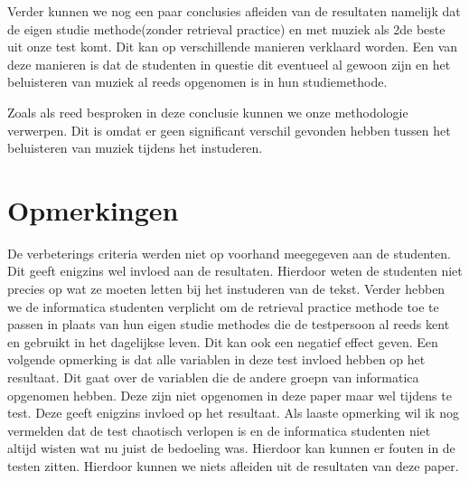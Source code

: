 \documentclass{hogent-article}
\begin{document}
	Verder kunnen we nog een paar conclusies afleiden van de resultaten namelijk dat de eigen studie methode(zonder retrieval practice) en met muziek als 2de beste uit onze test komt. Dit kan op verschillende manieren verklaard worden. Een van deze manieren is dat de studenten in questie dit eventueel al gewoon zijn en het beluisteren van muziek al reeds opgenomen is in hun studiemethode. 
	
	Zoals als reed besproken in deze conclusie kunnen we onze methodologie verwerpen. Dit is omdat er geen significant verschil gevonden hebben tussen het beluisteren van muziek tijdens het instuderen.
	
	
	\section{Opmerkingen}
	De verbeterings criteria werden niet op voorhand meegegeven aan de studenten. Dit geeft enigzins wel invloed aan de resultaten. Hierdoor weten de studenten niet precies op wat ze moeten letten bij het instuderen van de tekst.
	Verder hebben we de informatica studenten verplicht om de retrieval practice methode toe te passen in plaats van hun eigen studie methodes die de testpersoon al reeds kent en gebruikt in het dagelijkse leven. Dit kan ook een negatief effect geven.
	Een volgende opmerking is dat alle variablen in deze test invloed hebben op het resultaat. Dit gaat over de variablen die de andere groepn van informatica opgenomen hebben. Deze zijn niet opgenomen in deze paper maar wel tijdens te test. Deze geeft enigzins invloed op het resultaat.
	Als laaste opmerking wil ik nog vermelden dat de test chaotisch verlopen is en de informatica studenten niet altijd wisten wat nu juist de bedoeling was. Hierdoor kan kunnen er fouten in de testen zitten. 
	Hierdoor kunnen we niets afleiden uit de resultaten van deze paper.
	
	
	\printbibliography[heading=bibintoc]
	
\end{document}
